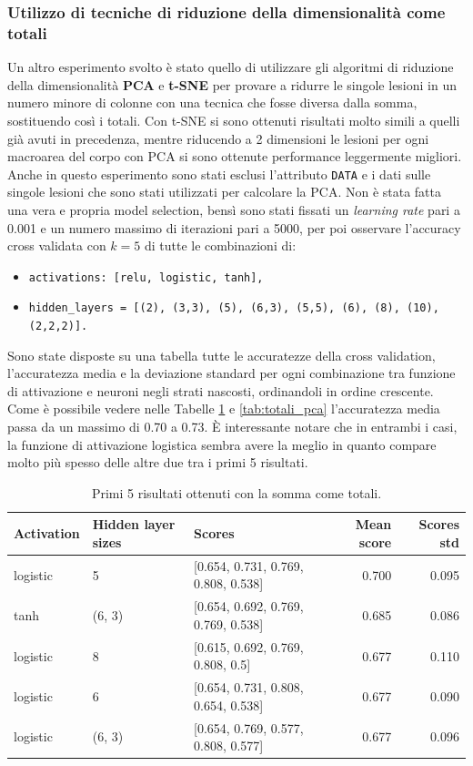 \documentclass[12pt, twoside, letterpaper]{report}
\begin{document}
			\subsubsection{Utilizzo di tecniche di riduzione della dimensionalità come totali}
				Un altro esperimento svolto è stato quello di utilizzare gli algoritmi di riduzione della dimensionalità \textbf{PCA} e \textbf{t-SNE} per provare a ridurre le singole lesioni in un numero minore di colonne con una tecnica che fosse diversa dalla somma, sostituendo così i totali. Con t-SNE si sono ottenuti risultati molto simili a quelli già avuti in precedenza, mentre riducendo a 2 dimensioni le lesioni per ogni macroarea del corpo con PCA si sono ottenute performance leggermente migliori. Anche in questo esperimento sono stati esclusi l'attributo \texttt{DATA} e i dati sulle singole lesioni che sono stati utilizzati per calcolare la PCA. Non è stata fatta una vera e propria model selection, bensì sono stati fissati un \textit{learning rate} pari a 0.001 e un numero massimo di iterazioni pari a 5000, per poi osservare l'accuracy cross validata con $k=5$ di tutte le combinazioni di: 
				\begin{itemize}
					\item \texttt{activations: [relu, logistic, tanh],}
    				\item \texttt{hidden\_layers = [(2), (3,3), (5), (6,3), (5,5), (6), (8), (10), (2,2,2)].}
				\end{itemize}
				Sono state disposte su una tabella tutte le accuratezze della cross validation, l'accuratezza media e la deviazione standard per ogni combinazione tra funzione di attivazione e neuroni negli strati nascosti, ordinandoli in ordine crescente. Come è possibile vedere nelle Tabelle \ref{tab:totali_somma} e \ref{tab:totali_pca} l'accuratezza media passa da un massimo di 0.70 a 0.73. È interessante notare che in entrambi i casi, la funzione di attivazione logistica sembra avere la meglio in quanto compare molto più spesso delle altre due tra i primi 5 risultati.
				\begin{table}
					\begin{tabular}{lllrr}
					\toprule
					Activation & Hidden layer sizes &                               Scores &  Mean score &  Scores std \\
					\midrule
					logistic &                  5 &  [0.654, 0.731, 0.769, 0.808, 0.538] &       0.700 &       0.095 \\
					tanh &             (6, 3) &  [0.654, 0.692, 0.769, 0.769, 0.538] &       0.685 &       0.086 \\
					logistic &                  8 &    [0.615, 0.692, 0.769, 0.808, 0.5] &       0.677 &       0.110 \\
					logistic &                  6 &  [0.654, 0.731, 0.808, 0.654, 0.538] &       0.677 &       0.090 \\
					logistic &             (6, 3) &  [0.654, 0.769, 0.577, 0.808, 0.577] &       0.677 &       0.096 \\
					\bottomrule
					\end{tabular}
					\caption{Primi 5 risultati ottenuti con la somma come totali.}
					\label{tab:totali_somma}
				\end{table}
\end{document}
